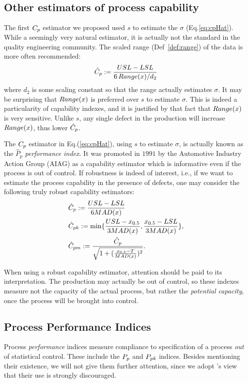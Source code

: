 \subsection{Other estimators of process capability}
The first $C_p$ estimator we proposed used $s$ to estimate the $\sigma$ (Eq.\ref{eq:cpHat}).
While a seemingly very natural estimator, it is actually not the standard in the quality engineering community. 
The scaled range (Def~\ref{def:range}) of the data is more often recommended: 
\begin{align}
	\hat{C}_p &:= \frac{USL-LSL}{6 \, Range(x)/d_2} \\
\end{align}
where $d_2$ is some scaling constant so that the range actually estimates $\sigma$. 
It may be surprising that $Range(x)$ is preferred over $s$ to estimate $\sigma$. This is indeed a particularity of capability indexes, and it is justified by that fact that $Range(x)$ is very sensitive. 
Unlike $s$, any single defect in the production will increase $Range(x)$, thus lower $\hat{C}_p$. 


The $C_p$ estimator in Eq.(\ref{eq:cpHat}), using $s$ to estimate $\sigma$, is actually known as the $\hat{P}_p$ \emph{performance index}.
It was promoted in $1991$ by the Automotive Industry Action Group (AIAG) as a capability estimator which is informative even if the process is out of control.
If robustness is indeed of interest, i.e., if we want to estimate the process capability in the presence of defects, one may consider the following truly robust capability estimators:
\begin{align}
\label{eq:robust_capability}
& \hat{C}_p := \frac{USL-LSL}{6 MAD(x)} \\
& \hat{C}_{pk} := \min\{ \frac{USL- x_{0.5}}{3 MAD(x)},\frac{x_{0.5}-LSL}{3 MAD(x)} \}, \\
& \hat{C}_{pm} := \frac{\hat{C}_p}{\sqrt{1+(\frac{x_{0.5}-T}{MAD(x)})^2}}. 
\end{align}

When using a robust capability estimator, attention should be paid to its interpretation. 
The production may actually be out of control, so these indexes measure not the capacity of the actual process, but rather the \emph{potential capacity}, once the process will be brought into control.




\subsection{Process Performance Indices}
Process \emph{performance} indices measure compliance to specification of a process \emph{out} of statistical control. 
These include the $P_{p}$ and $P_{pk}$ indices. 
Besides mentioning their existence, we will not give them further attention, since we adopt \cite{montgomery_introduction_2007}'s view that their use is strongly discouraged. 


